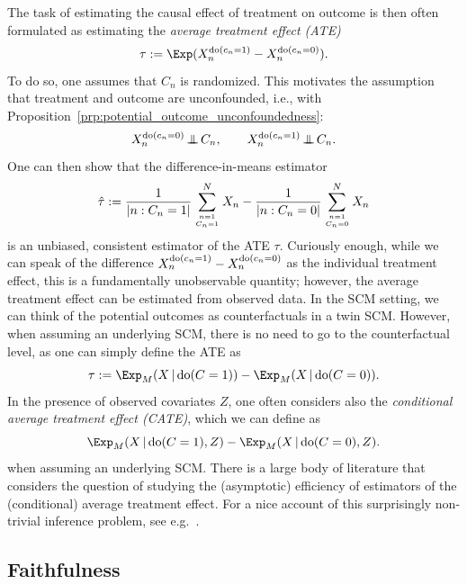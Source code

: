 The task of estimating the causal effect of treatment on outcome is then often formulated as estimating the
\emph{average treatment effect (ATE)}
$$\tau := \Exp(X_n^{\doit(c_n=1)} - X_n^{\doit(c_n=0)}).$$
To do so, one assumes that $C_n$ is randomized. This motivates the assumption
that treatment and outcome are unconfounded, i.e., with Proposition~\ref{prp:potential_outcome_unconfoundedness}:
$$X_n^{\operatorname{do}(c_n=0)} \operatorname*{\perp\mkern-11mu\perp} C_n, \qquad X_n^{\operatorname{do}(c_n=1)} \operatorname*{\perp\mkern-11mu\perp} C_n.$$
One can then show that the difference-in-means estimator 
$$\hat{\tau} := \frac{1}{|n : C_n=1|} \sum_{n=1 \atop C_n=1}^N X_n - \frac{1}{|n : C_n=0|} \sum_{n=1 \atop C_n=0}^N X_n$$
is an unbiased, consistent estimator of the ATE $\tau$.
Curiously enough, while we can speak of the difference
$X_n^{\operatorname{do}(c_n=1)} - X_n^{\operatorname{do}(c_n=0)}$ as the individual treatment effect,
this is a fundamentally unobservable quantity; however, the average treatment effect can 
be estimated from observed data. In the SCM setting, we can think of the potential
outcomes as counterfactuals in a twin SCM. However, when assuming an underlying SCM,
there is no need to go to the counterfactual level, as one can simply define the
ATE as
$$\tau := \Exp_{M}(X \given \doit(C=1)) - \Exp_{M}(X \given \doit(C=0)).$$
In the presence of observed covariates $Z$, one often considers also the \emph{conditional
average treatment effect (CATE)}, which we can define as
$$\Exp_{M}(X \given \doit(C=1),Z) - \Exp_{M}(X \given \doit(C=0),Z).$$
when assuming an underlying SCM. There is a large body of literature that considers the
question of studying the (asymptotic) efficiency of estimators of the (conditional)
average treatment effect. For a nice account of this surprisingly non-trivial inference problem, 
see e.g.\ \cite{Wager2020}.


\subsection{Faithfulness}

